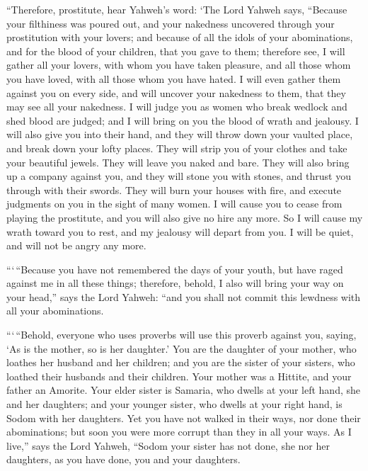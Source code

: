  ``Therefore, prostitute, hear Yahweh's word: 
`The Lord Yahweh says, ``Because your filthiness was poured out, and
your nakedness uncovered through your prostitution with your lovers; and
because of all the idols of your abominations, and for the blood of your
children, that you gave to them;  therefore see, I will
gather all your lovers, with whom you have taken pleasure, and all those
whom you have loved, with all those whom you have hated. I will even
gather them against you on every side, and will uncover your nakedness
to them, that they may see all your nakedness.  I will
judge you as women who break wedlock and shed blood are judged; and I
will bring on you the blood of wrath and jealousy.  I will
also give you into their hand, and they will throw down your vaulted
place, and break down your lofty places. They will strip you of your
clothes and take your beautiful jewels. They will leave you naked and
bare.  They will also bring up a company against you, and
they will stone you with stones, and thrust you through with their
swords.  They will burn your houses with fire, and execute
judgments on you in the sight of many women. I will cause you to cease
from playing the prostitute, and you will also give no hire any more.
 So I will cause my wrath toward you to rest, and my
jealousy will depart from you. I will be quiet, and will not be angry
any more.

 ```\,``Because you have not remembered the days of your
youth, but have raged against me in all these things; therefore, behold,
I also will bring your way on your head,'' says the Lord Yahweh: ``and
you shall not commit this lewdness with all your abominations.

 ```\,``Behold, everyone who uses proverbs will use this
proverb against you, saying, `As is the mother, so is her daughter.'
 You are the daughter of your mother, who loathes her
husband and her children; and you are the sister of your sisters, who
loathed their husbands and their children. Your mother was a Hittite,
and your father an Amorite.  Your elder sister is Samaria,
who dwells at your left hand, she and her daughters; and your younger
sister, who dwells at your right hand, is Sodom with her daughters.
 Yet you have not walked in their ways, nor done their
abominations; but soon you were more corrupt than they in all your ways.
 As I live,'' says the Lord Yahweh, ``Sodom your sister has
not done, she nor her daughters, as you have done, you and your
daughters.

